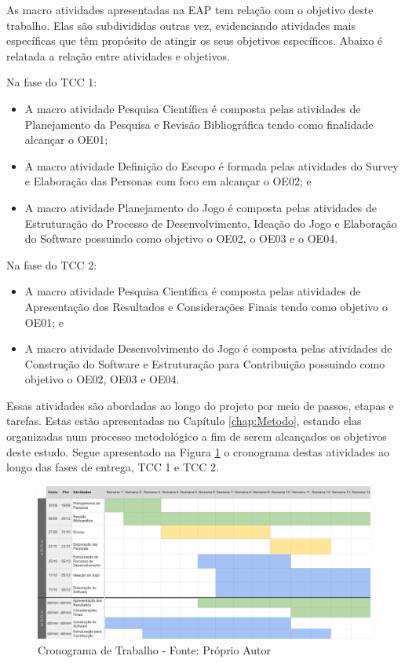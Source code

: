 As macro atividades apresentadas na EAP tem relação com o objetivo deste trabalho. Elas são subdivididas outras vez, evidenciando atividades mais específicas que têm propósito de atingir os seus objetivos específicos. Abaixo é relatada a relação entre atividades e objetivos. 

Na fase do TCC 1:

\begin{itemize}
    \item A macro atividade Pesquisa Científica é composta pelas atividades de Planejamento da Pesquisa e Revisão Bibliográfica tendo como finalidade alcançar o OE01;
    \item A macro atividade Definição do Escopo é formada pelas atividades do Survey e Elaboração das Personas com foco em alcançar o OE02; e
    \item A macro atividade Planejamento do Jogo é composta pelas atividades de Estruturação do Processo de Desenvolvimento, Ideação do Jogo e Elaboração do Software possuindo como objetivo o OE02, o OE03 e o OE04.
\end{itemize}

Na fase do TCC 2:

\begin{itemize}
    \item A macro atividade Pesquisa Científica é composta pelas atividades de Apresentação dos Resultados e Considerações Finais tendo como objetivo o OE01; e
    \item A macro atividade Desenvolvimento do Jogo é composta pelas atividades de Construção do Software e Estruturação para Contribuição possuindo como objetivo o OE02, OE03 e OE04.
\end{itemize}

Essas atividades são abordadas ao longo do projeto por meio de passos, etapas e tarefas. Estas estão apresentadas no Capítulo \ref{chap:Metodo}, estando elas organizadas num processo metodológico a fim de serem alcançados os objetivos deste estudo. Segue apresentado na Figura \ref{Fig:cronograma.png} o cronograma destas atividades ao longo das fases de entrega, TCC 1 e TCC 2.

\newpage
\begin{figure}[htbp]
	\centering
		\includegraphics[keepaspectratio=true,scale=0.42]{figuras/cronograma.png}
	\caption{Cronograma de Trabalho - Fonte: Próprio Autor}
	\label{Fig:cronograma.png}
\end{figure}

